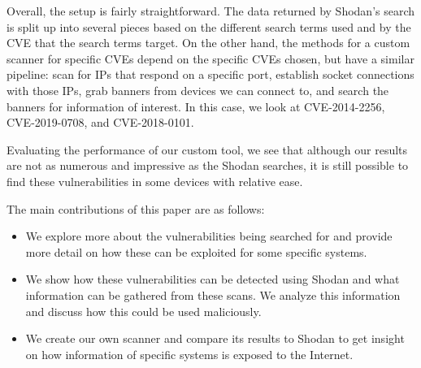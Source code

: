 Overall, the setup is fairly straightforward.
The data returned by Shodan's search is split up into several pieces based
on the different search terms used and by the CVE that the search terms
target. On the other hand, the methods for a custom scanner for specific
CVEs depend on the specific CVEs chosen, but have a similar pipeline:
scan for IPs that respond on a specific port, establish socket connections
with those IPs, grab banners from devices we can connect to, and search
the banners for information of interest. In this case, we look at
CVE-2014-2256, CVE-2019-0708, and CVE-2018-0101.

Evaluating the performance of our custom tool, we see that although our
results are not as numerous and impressive as the Shodan searches, it is
still possible to find these vulnerabilities in some devices with relative
ease.

The main contributions of this paper are as follows:
\begin{itemize}
    \item We explore more about the vulnerabilities being searched for and
        provide more detail on how these can be exploited for some specific
        systems.
    \item We show how these vulnerabilities can be detected using Shodan
        and what information can be gathered from these scans. We analyze
        this information and discuss how this could be used maliciously.
    \item We create our own scanner and compare its results to Shodan to
        get insight on how information of specific systems is exposed to
        the Internet.
\end{itemize}
